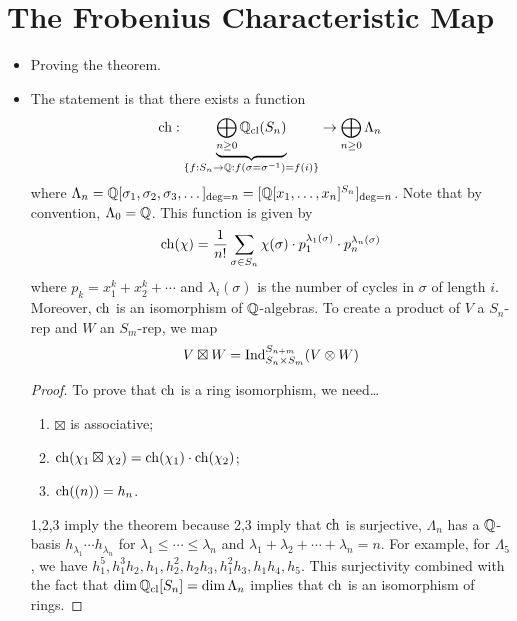 \documentclass[../notes.tex]{subfiles}
\begin{document}
\section{The Frobenius Characteristic Map}
\begin{itemize}
    \item {}Proving the theorem.
    \item The statement is that there exists a function
    \begin{equation*}
        \operatorname{ch}:\underbrace{\bigoplus_{n\geq 0}\mathbb{Q}_\text{cl}(S_n)}_{\{f:S_n\to\mathbb{Q}:f(\sigma=\sigma^{-1})=f(i)\}}\to\bigoplus_{n\geq 0}\Lambda_n
    \end{equation*}
    where $\Lambda_n=\mathbb{Q}[\sigma_1,\sigma_2,\sigma_3,\dots]_{\deg=n}=[\mathbb{Q}[x_1,\dots,x_n]^{S_n}]_{\deg=n}$. Note that by convention, $\Lambda_0=\mathbb{Q}$. This function is given by
    \begin{equation*}
        \operatorname{ch}(\chi) = \frac{1}{n!}\sum_{\sigma\in S_n}\chi(\sigma)\cdot p_1^{\lambda_1(\sigma)}\cdot p_n^{\lambda_n(\sigma)}
    \end{equation*}
    where $p_k=x_1^k+x_2^k+\cdots$ and $\lambda_i(\sigma)$ is the number of cycles in $\sigma$ of length $i$. Moreover, $\operatorname{ch}$ is an isomorphism of $\mathbb{Q}$-algebras. To create a product of $V$ a $S_n$-rep and $W$ an $S_m$-rep, we map
    \begin{equation*}
        V\boxtimes W = \operatorname{Ind}_{S_n\times S_m}^{S_{n+m}}(V\otimes W)
    \end{equation*}
    \begin{proof}
        To prove that $\operatorname{ch}$ is a ring isomorphism, we need\dots
        \begin{enumerate}
            \item $\boxtimes$ is associative;
            \item $\operatorname{ch}(\chi_1\boxtimes\chi_2)=\operatorname{ch}(\chi_1)\cdot\operatorname{ch}(\chi_2)$;
            \item $\operatorname{ch}((n))=h_n$.
        \end{enumerate}
        1,2,3 imply the theorem because 2,3 imply that $\operatorname{ch}$ is surjective, $\Lambda_n$ has a $\mathbb{Q}$-basis $h_{\lambda_1}\cdots h_{\lambda_n}$ for $\lambda_1\leq\cdots\leq\lambda_n$ and $\lambda_1+\lambda_2+\cdots+\lambda_n=n$. For example, for $\Lambda_5$, we have $h_1^5,h_1^3h_2,h_1,h_2^2,h_2h_3,h_1^2h_3,h_1h_4,h_5$. This surjectivity combined with the fact that $\dim\mathbb{Q}_\text{cl}[S_n]=\dim\Lambda_n$ implies that $\operatorname{ch}$ is an isomorphism of rings.


\end{proof}
\end{itemize}
\end{document}

